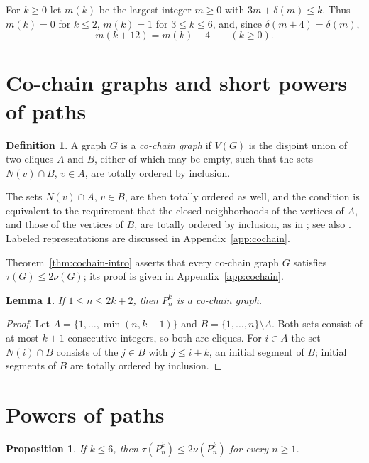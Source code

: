 \documentclass{amsart}
\newtheorem{lemma}[theorem]{Lemma}
\newtheorem{proposition}[theorem]{Proposition}
\theoremstyle{definition}
\newtheorem{definition}[theorem]{Definition}
\theoremstyle{remark}
\numberwithin{equation}{section}
\numberwithin{table}{section}
\begin{document}
For $k\ge0$ let $m(k)$ be the largest integer $m\ge0$ with $3m+\delta(m)\le k$. Thus $m(k)=0$ for $k\le2$, $m(k)=1$ for $3\le k\le6$, and, since $\delta(m+4)=\delta(m)$,
\begin{equation}\label{eq:mperiodic}
m(k+12)=m(k)+4\qquad(k\ge0).
\end{equation}

\section{Co-chain graphs and short powers of paths}\label{sec:cochain}

\begin{definition}\label{def:cochain}
A graph $G$ is a \emph{co-chain graph} if $V(G)$ is the disjoint union of two cliques $A$ and $B$, either of which may be empty, such that the sets $N(v)\cap B$, $v\in A$, are totally ordered by inclusion.
\end{definition}

The sets $N(v)\cap A$, $v\in B$, are then totally ordered as well, and the condition is equivalent to the requirement that the closed neighborhoods of the vertices of $A$, and those of the vertices of $B$, are totally ordered by inclusion, as in \cite{BBGHMNO}; see also \cite{CG}. Labeled representations are discussed in Appendix~\ref{app:cochain}.

Theorem~\ref{thm:cochain-intro} asserts that every co-chain graph $G$ satisfies $\tau(G)\le2\nu(G)$; its proof is given in Appendix~\ref{app:cochain}.

\begin{lemma}\label{lem:shortpath}
If $1\le n\le2k+2$, then $P_n^k$ is a co-chain graph.
\end{lemma}

\begin{proof}
Let $A=\{1,\dots,\min(n,k+1)\}$ and $B=\{1,\dots,n\}\setminus A$. Both sets consist of at most $k+1$ consecutive integers, so both are cliques. For $i\in A$ the set $N(i)\cap B$ consists of the $j\in B$ with $j\le i+k$, an initial segment of $B$; initial segments of $B$ are totally ordered by inclusion.
\end{proof}

\section{Powers of paths}\label{sec:paths}

\begin{proposition}\label{prop:smallk}
If $k\le6$, then $\tau(P_n^k)\le2\nu(P_n^k)$ for every $n\ge1$.
\end{proposition}
\end{document}
